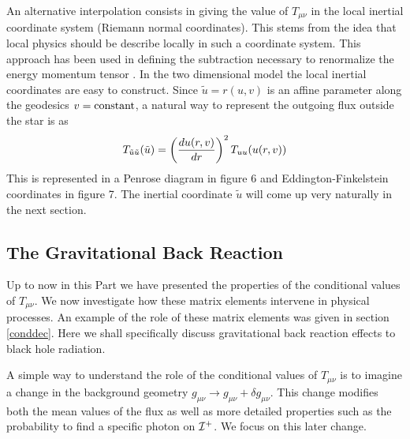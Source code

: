 \documentclass[12pt]{article}
\begin{document}
An alternative interpolation
 consists in giving the value of $T_{\mu\nu}$ in the local
inertial coordinate system (Riemann normal coordinates). This stems from the
idea that
local
physics
should be describe locally in such a coordinate system. This approach has
 been used
in defining the subtraction necessary to
renormalize the energy momentum tensor
\cite{birreld,mpblocal,mas}. In the two dimensional model the
local inertial coordinates are easy to construct. Since $\tilde u = r(u,v)$
is an affine parameter along the geodesics
$v={\rm constant}$, a natural way to represent the outgoing flux outside the
star is as
\begin{equation}
T_{\tilde u \tilde u} (\tilde u) = \left( {d u(r,v) \over dr} \right )^2
T_{uu}(u(r,v))\label{localc}
\end{equation}
This is represented in  a
Penrose diagram in figure 6 and Eddington-Finkelstein coordinates in figure 7.
The inertial coordinate $\tilde u$ will come up
very naturally in the next section.

\subsection{The Gravitational Back Reaction}\label{back}


Up to now in this Part we have presented the properties of the
conditional values of $ T_{\mu\nu}$. We now investigate how these matrix
elements intervene in physical processes. An example of the role of these
matrix elements was given in section \ref{conddec}.
Here we shall specifically discuss
gravitational back reaction effects to black hole radiation.

A simple way to understand the role of the
conditional values of $ T_{\mu\nu}$ is to imagine a change in the background
geometry $g_{\mu\nu} \to g_{\mu\nu} + \delta g_{\mu\nu}$. This change
modifies both the mean values of the flux as well as more detailed properties
such as the probability to find a specific photon on ${\cal{I}}^+$.
We focus on this later change.
\end{document}
